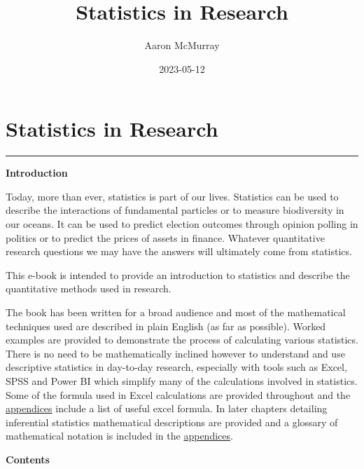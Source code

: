 \documentclass[
]{book}
\title{Statistics in Research}
\author{Aaron McMurray}
\date{2023-05-12}
\begin{document}
\maketitle

{
\setcounter{tocdepth}{1}
\tableofcontents
}
\hypertarget{Statistics-Primer}{%
\chapter*{Statistics in Research}\label{Statistics-Primer}}

\begin{center}\rule{0.5\linewidth}{0.5pt}\end{center}

\textbf{Introduction}

Today, more than ever, statistics is part of our lives. Statistics can be used to describe the interactions of fundamental particles or to measure biodiversity in our oceans. It can be used to predict election outcomes through opinion polling in politics or to predict the prices of assets in finance. Whatever quantitative research questions we may have the answers will ultimately come from statistics.

This e-book is intended to provide an introduction to statistics and describe the quantitative methods used in research.

The book has been written for a broad audience and most of the mathematical techniques used are described in plain English (as far as possible). Worked examples are provided to demonstrate the process of calculating various statistics. There is no need to be mathematically inclined however to understand and use descriptive statistics in day-to-day research, especially with tools such as Excel, SPSS and Power BI which simplify many of the calculations involved in statistics. Some of the formula used in Excel calculations are provided throughout and the \protect\hyperlink{appendices}{appendices} include a list of useful excel formula. In later chapters detailing inferential statistics mathematical descriptions are provided and a glossary of mathematical notation is included in the \protect\hyperlink{appendices}{appendices}.

\textbf{Contents}
\end{document}
